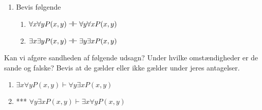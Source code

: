 \begin{opg}
\begin{enumerate}
\begin{solution}
\begin{proofbox}
\[\[\[\[							\lbl{is_true}
							\: \exists x \, \phi \= \exists x\text{ i } \ref{phi_true} \\
							\label{_pr_exc1_neg_box2a_end}
							\: \bot \= \neg\text{e } \ref{is_true},\ref{is_false}
						\]
						\label{_pr_exc1_forall_box2a_end}
						\: \neg \phi[x_0/x] \=  \ref{neg_box}-\ref{_pr_exc1_neg_box2a_end}
					\]
					\: \forall x \, \neg \phi \= \forall x  \ref{forall_box}-\ref{_pr_exc1_forall_box2a_end} \\
					\label{_pr_exc1_pbc_box2a_end}
					\: \bot \=  \ref{forall_is_true},\ref{forall_is_false}
				\]
				\label{_pr_exc1_imp_box2a_end}
				\: \exists x \, \phi \=  \ref{pbc_box}-\ref{_pr_exc1_pbc_box2a_end}
			\]
			\: \neg \forall x \, \neg \phi \imp \exists x \, \phi \=  \ref{imp_box2}-\ref{_pr_exc1_imp_box2a_end} \\
			\: \exists x \, \phi \bimp \neg \forall x \, \neg \phi \=  \ref{imp1},\ref{imp2}
		\end{proofbox}
	\end{solution}
	\item{Bevis følgende}
	\begin{enumerate}
		\item $\forall x \forall y P(x,y) \dashv\vdash \forall y \forall x P(x,y)$
		\item $\exists x \exists y P(x,y) \dashv\vdash \exists y \exists x P(x,y)$
	\end{enumerate}
\end{enumerate}
\end{opg}

\begin{opg}
	Kan vi afgøre sandheden af følgende udsagn? Under hvilke omstændigheder er de sande og falske? Bevis at de gælder eller ikke gælder under jeres antagelser.
	\begin{enumerate}
		\item $\exists x \forall y P(x,y) \vdash \forall y \exists x P(x,y)$
		\item *** $\forall y \exists x P(x,y) \vdash \exists x \forall y P(x,y)$
		
	\end{enumerate}
\end{opg}

\ifdefined\startOpgaverPraedikatlogik\fi
